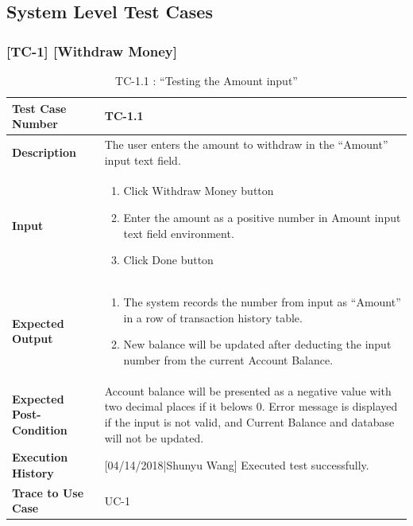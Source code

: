 \documentclass[12pt]{article}
\begin{document}
\subsection{System Level Test Cases}

\subsubsection{[TC-1] [Withdraw Money]} \label{tc:1}
\begin{table}[H]
\caption{ TC-1.1 : “Testing the Amount input”}
\begin{center}
\begin{tabular}{|p{5.5	cm}|p{11cm}|}
\hline
\bf Test Case Number & 
TC-1.1 \\
\hline
\bf Description & 
The user enters the amount to withdraw in the “Amount” input text field.\\
\hline
\bf Input & 
\begin{enumerate}
  \item Click Withdraw Money button
  \item Enter the amount as a positive number in Amount input text field environment.
  \item Click Done button
\end{enumerate} \\
\hline
\bf Expected Output & 
\begin{enumerate}
  \item The system records the number from input as “Amount” in a row of transaction history table.
  \item New balance will be updated after deducting the input number from the current Account Balance.
\end{enumerate} \\
\hline
\bf Expected Post-Condition & 
Account balance will be presented as a negative value with two decimal places if it belows 0. Error message is displayed if the input is not valid, 
and Current Balance and database will not be updated.\\
\hline
\bf Execution History & 
[04/14/2018|Shunyu Wang] Executed test successfully.\\
\hline
\bf Trace to Use Case & 
UC-1\\
\hline

\end{tabular}
\end{center}
\end{table}
\end{document}
